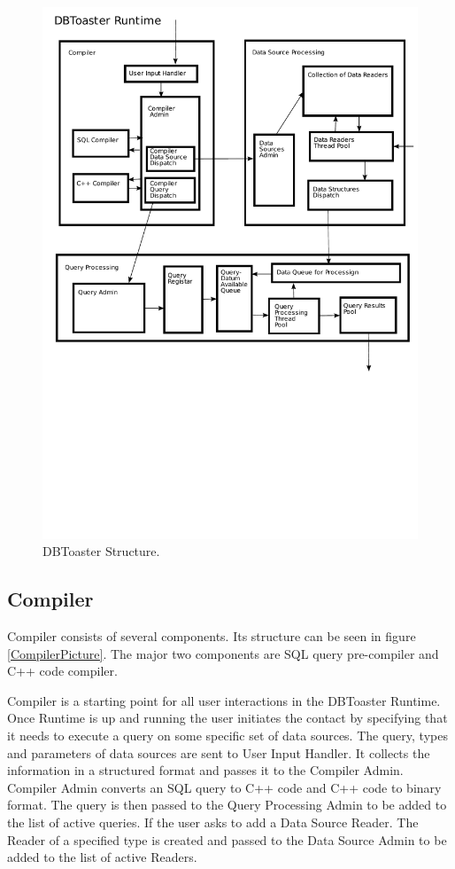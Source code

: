 \documentclass[11pt]{article}
\begin{document}
\begin{figure}
  \includegraphics[width=4.50in]{DBToasterRuntime.pdf}
  \caption{DBToaster Structure.}
  \label{DBToasterPic}
\end{figure}

\subsection{Compiler}

Compiler consists of several components. Its structure can be seen in figure \ref{CompilerPicture}. The major two components are SQL query pre-compiler and C++ code compiler. 

Compiler is a starting point for all user interactions in the DBToaster Runtime. Once Runtime is up and running the user initiates the contact by specifying that it needs to execute a query on some specific set of data sources. The query, types and parameters of data sources are sent to User Input Handler. It collects the information in a structured format and passes it to the Compiler Admin. Compiler Admin converts an SQL query to C++ code and C++ code to binary format. The query is then passed to the Query Processing Admin to be added to the list of active queries. If the user asks to add a Data Source Reader. The Reader of a specified type is created and passed to the Data Source Admin to be added to the list of active Readers. 
\end{document}
